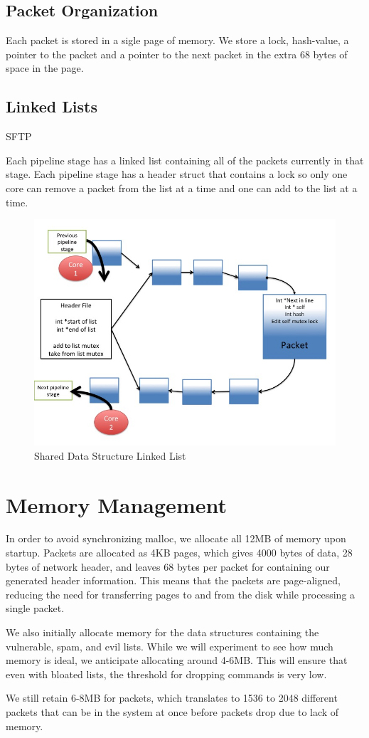 \documentclass{article}
\begin{document}
\subsection{Packet Organization}
Each packet is stored in a sigle page of memory. We store a lock, hash-value, a pointer to the packet and a pointer to the next packet in the extra 68 bytes of space in the page.

\subsection{Linked Lists}SFTP

Each pipeline stage has a linked list containing all of the packets currently in that stage. Each pipeline stage has a header struct that contains a lock so only one core can remove a packet from the list at a time and one can add to the list at a time.

\begin{figure}[h]
	\includegraphics[width = \textwidth]{Slide1}
	\caption{Shared Data Structure Linked List}
\end{figure}

\section{Memory Management}

In order to avoid synchronizing malloc, we allocate all 12MB of memory upon startup. Packets are allocated as 4KB pages, which gives 4000 bytes of data, 28 bytes of network header, and leaves 68 bytes per packet for containing our generated header information. This means that the packets are page-aligned, reducing the need for transferring pages to and from the disk while processing a single packet. 

We also initially allocate memory for the data structures containing the vulnerable, spam, and evil lists. While we will experiment to see how much memory is ideal, we anticipate allocating around 4-6MB. This will ensure that even with bloated lists, the threshold for dropping commands is very low.

We still retain 6-8MB for packets, which translates to 1536 to 2048 different packets that can be in the system at once before packets drop due to lack of memory. 
\end{document}
